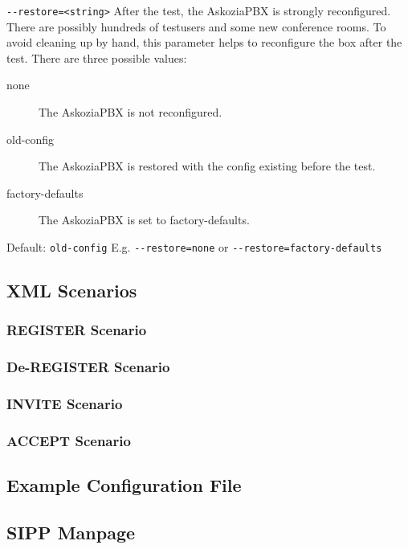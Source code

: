 \begin {description}
\item {\texttt{-{}-restore=<string>}} \newline
After the test, the AskoziaPBX is strongly reconfigured. There are possibly hundreds
of testusers and some new conference rooms. To avoid cleaning up by hand, this parameter
helps to reconfigure the box after the test. There are three possible values:
	\begin{description}
	\item [none] The AskoziaPBX is not reconfigured.
	\item [old-config] The AskoziaPBX is restored with the config existing before the test.
	\item [factory-defaults] The AskoziaPBX is set to factory-defaults.
	\end{description}
Default: \texttt{old-config}
\newline E.g. \texttt{-{}-restore=none} or \texttt{-{}-restore=factory-defaults}
\end{description}

\subsection{XML Scenarios}
\subsubsection{REGISTER Scenario}
\subsubsection{De-REGISTER Scenario}
\subsubsection{INVITE Scenario}
\subsubsection{ACCEPT Scenario}

\subsection{Example Configuration File}

\subsection{SIPP Manpage}

